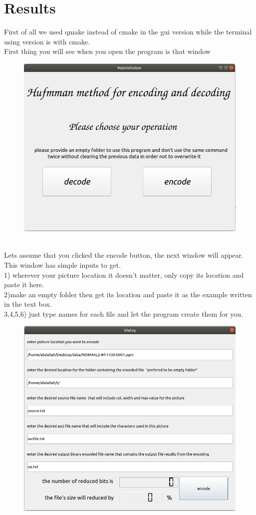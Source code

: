 \documentclass[11 pt,twocolumn,letterpaper]{article}
\begin{document}
\section{Results}
First of all we used qmake instead of cmake in the gui version while the terminal using version is with cmake.\\
First thing you will see when you open the program is that window\\
\begin{figure}[ht]
\includegraphics[width=0.8\linewidth]{figure 3}
\end{figure}\\
Lets assume that you clicked the encode button, the next window will appear.\\
This window has simple inputs to get.\\
1) wherever your picture location it doesn’t matter, only copy its location and paste it here.\\
2)make an empty folder then get its location and paste it as the example written in the text box.\\
3,4,5,6) just type names for each file and let the program create them for you.\\
\begin{figure}[ht]
\includegraphics[width=0.8\linewidth]{figure 4}
\end{figure}\\
\end{document}
